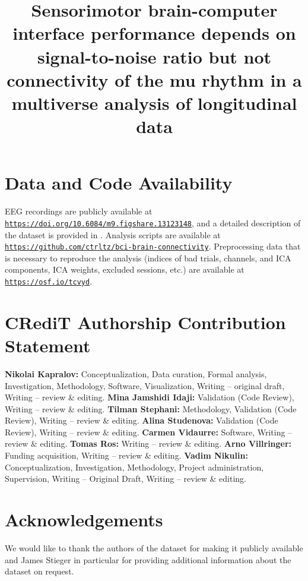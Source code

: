 \documentclass[preprint,authoryear,semicolon,12pt]{elsarticle}
\numberwithin{equation}{section}
\begin{document}
\begin{frontmatter}


\title{Sensorimotor brain-computer interface performance depends on signal-to-noise ratio but not connectivity of the mu rhythm in a multiverse analysis of longitudinal data}


    

\begin{abstract}
    
\end{abstract}

\end{frontmatter}


\newpage









\section*{Data and Code Availability}

EEG recordings are publicly available at \texttt{\url{https://doi.org/10.6084/m9.figshare.13123148}}, and a detailed description of the dataset is provided in \citep{Stieger2021_dataset}. Analysis scripts are available at \texttt{\url{https://github.com/ctrltz/bci-brain-connectivity}}. Preprocessing data that is necessary to reproduce the analysis (indices of bad trials, channels, and ICA components, ICA weights, excluded sessions, etc.) are available at \texttt{\url{https://osf.io/tcvyd}}.

\section*{CRediT Authorship Contribution Statement}

\textbf{Nikolai Kapralov:} Conceptualization, Data curation, Formal analysis, Investigation, Methodology, Software, Visualization, Writing – original draft, Writing – review \& editing. \textbf{Mina Jamshidi Idaji:} Validation (Code Review), Writing – review \& editing. \textbf{Tilman Stephani:} Methodology, Validation (Code Review), Writing – review \& editing. \textbf{Alina Studenova:} Validation (Code Review), Writing – review \& editing. \textbf{Carmen Vidaurre:} Software, Writing – review \& editing. \textbf{Tomas Ros:} Writing – review \& editing. \textbf{Arno Villringer:} Funding acquisition, Writing – review \& editing. \textbf{Vadim Nikulin:} Conceptualization, Investigation, Methodology, Project administration, Supervision, Writing – Original Draft, Writing – review \& editing.

\section*{Acknowledgements}

We would like to thank the authors of the dataset for making it publicly available and James Stieger in particular for providing additional information about the dataset on request.

 

\end{document}
